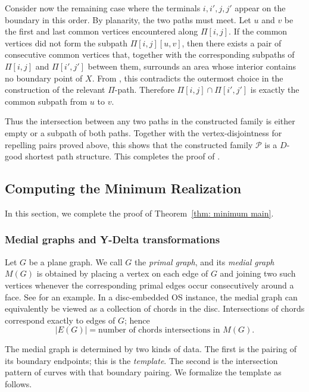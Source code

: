 \documentclass[11pt]{article}
\begin{document}
Consider now the remaining case where the terminals $i,i',j,j'$ appear on the boundary in this order.
By planarity, the two paths must meet.  Let $u$ and $v$ be the first
and last common vertices encountered along $\Pi[i,j]$.  If the common
vertices did not form the subpath $\Pi[i,j][u,v]$, then there exists a pair of
consecutive common vertices that, together with the corresponding
subpaths of $\Pi[i,j]$ and $\Pi[i',j']$ between them, surrounds an area whose interior contains
no boundary point of $X$.  From , this contradicts the outermost choice in
the construction of the relevant $\Pi$-path.  Therefore
$\Pi[i,j]\cap \Pi[i',j']$
is exactly the common subpath from $u$ to $v$.

Thus the intersection between any two paths in the constructed family is
either empty or a subpath of both paths.  Together with the vertex-disjointness
for repelling pairs proved above, this shows that the constructed family
$\mathcal P$ is a $D$-good shortest path structure.  This completes
the proof of .
\subsection{Computing the Minimum Realization}
\label{sec: min_realization}

In this section, we complete the proof of Theorem~\ref{thm: minimum main}.

\subsubsection{Medial graphs and Y-Delta transformations}

Let $G$ be a plane graph. We call $G$ the \emph{primal graph}, and its \emph{medial graph} $M(G)$ is obtained by placing a vertex on each edge of $G$ and joining two such vertices whenever the corresponding primal edges occur consecutively around a face. See  for an example. In a disc-embedded OS instance, the medial graph can equivalently be viewed as a collection of chords in the disc. Intersections of chords correspond exactly to edges of $G$; hence
\[
   |E(G)|=\text{number of chords intersections in }M(G).
\]

The medial graph is determined by two kinds of data.  The first is the pairing of its boundary endpoints; this is the \emph{template}.  The second is the intersection pattern of curves with that boundary pairing.  We formalize the template as follows.
\end{document}

